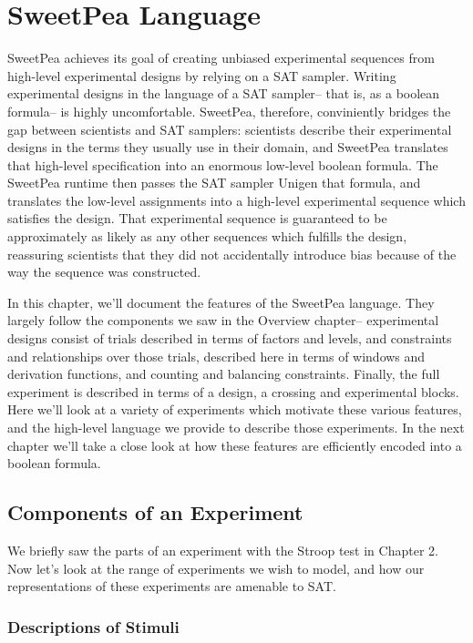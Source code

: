 
\chapter{SweetPea Language}

SweetPea achieves its goal of creating unbiased experimental sequences from high-level experimental designs by relying on a SAT sampler. Writing experimental designs in the language of a SAT sampler-- that is, as a boolean formula-- is highly uncomfortable. SweetPea, therefore, conviniently bridges the gap between scientists and SAT samplers: scientists describe their experimental designs in the terms they usually use in their domain, and SweetPea translates that high-level specification into an enormous low-level boolean formula. The SweetPea runtime then passes the SAT sampler Unigen that formula, and translates the low-level assignments into a high-level experimental sequence which satisfies the design. That experimental sequence is guaranteed to be approximately as likely as any other sequences which fulfills the design, reassuring scientists that they did not accidentally introduce bias because of the way the sequence was constructed.

In this chapter, we'll document the features of the SweetPea language. They largely follow the components we saw in the Overview chapter-- experimental designs consist of trials described in terms of factors and levels, and constraints and relationships over those trials, described here in terms of windows and derivation functions, and counting and balancing constraints. Finally, the full experiment is described in terms of a design, a crossing and experimental blocks. Here we'll look at a variety of experiments which motivate these various features, and the high-level language we provide to describe those experiments. In the next chapter we'll take a close look at how these features are efficiently encoded into a boolean formula.


\section{Components of an Experiment}

We briefly saw the parts of an experiment with the Stroop test in Chapter 2. Now let's look at the range of experiments we wish to model, and how our representations of these experiments are amenable to SAT.

\subsection{Descriptions of Stimuli}

